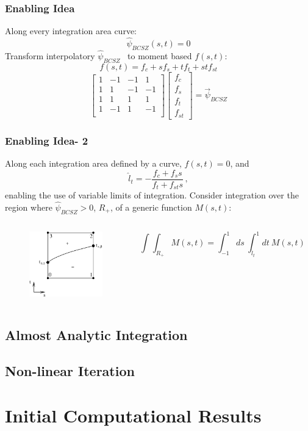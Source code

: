 \documentclass{beamer}
\newcommand{\be}{\begin{equation*}}   %
\newcommand{\ee}{\end{equation*}}
\newcommand{\benum}{\begin{equation}}   %
\newcommand{\eenum}{\end{equation}}
\newcommand{\BCSZH}{\ensuremath{\widehat{\psi}_{BCSZ}}}
\newcommand{\pec}{\, ,}
\begin{document}
\begin{frame}
\frametitle{Enabling Idea}
Along every integration area curve:
\be
\BCSZH(s,t) = 0
\ee
Transform interpolatory \BCSZH~ to moment based $f(s,t)$:
\benum
f(s,t) = f_c + s f_s + t f_t + st f_{st} 
\label{eq:f_def}
\eenum
\benum
\left[ 
\begin{array}{cccc}
1 &	 -1	& -1 &  1    \\
1 &		1	& -1	&  -1		\\	
1 &	  1	&  1		&  1		\\
1 &		-1	& 1		&  -1		\\
\end{array}
\right]
\left[
\begin{array}{c}
f_c \\
f_s \\
f_t \\
f_{st} 
\end{array}
\right]
=\vec{\psi}_{BCSZ}
\eenum

\end{frame}
\begin{frame}
\frametitle{Enabling Idea- 2}

Along each integration area defined by a curve, $f(s,t) = 0$, and 
\benum
\hat{l}_t  = -\frac{f_c + f_s s}{f_t + f_{st} s} \pec
\eenum
enabling the use of variable limits of integration. 
Consider integration over the region where $\BCSZH>0$, $R_+$, of a generic function $M(s,t)$:
\begin{columns}[c]
\begin{figure}
\centering
\includegraphics[width=1.25in]{neg_same_side_pdt_int} 
\end{figure}
\be
\int{\int_{R_+}{ M(s,t) } } = 
\int_{-1}^{1}{ds~\int_{\hat{l}_t}^1{dt~M(s,t)} } 
\ee
\end{columns}
\end{frame}

\subsection{Almost Analytic Integration}

\subsection{Non-linear Iteration}


\section{Initial Computational Results}

\end{document}
